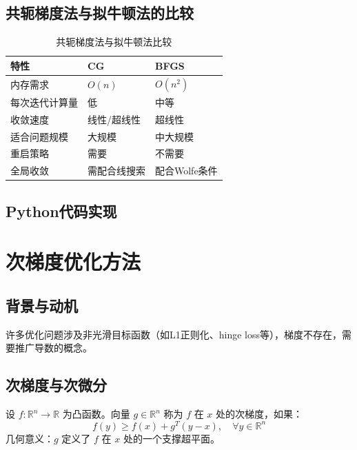 \subsection{共轭梯度法与拟牛顿法的比较}

\begin{table}[H]
\centering
\caption{共轭梯度法与拟牛顿法比较}
\begin{tabular}{@{}lll@{}}
\toprule
\textbf{特性} & \textbf{CG} & \textbf{BFGS} \\
\midrule
内存需求 & $O(n)$ & $O(n^2)$ \\
每次迭代计算量 & 低 & 中等 \\
收敛速度 & 线性/超线性 & 超线性 \\
适合问题规模 & 大规模 & 中大规模 \\
重启策略 & 需要 & 不需要 \\
全局收敛 & 需配合线搜索 & 配合Wolfe条件 \\
\bottomrule
\end{tabular}
\end{table}

\subsection{Python代码实现}\label{sec:conjugate-code}

\section{次梯度优化方法}\label{sec:subgradient}

\subsection{背景与动机}

许多优化问题涉及非光滑目标函数（如L1正则化、hinge loss等），梯度不存在，需要推广导数的概念。

\subsection{次梯度与次微分}\label{sec:subgradient-def}

\begin{definition}[次梯度]
设 $f: \mathbb{R}^n \to \mathbb{R}$ 为凸函数。向量 $g \in \mathbb{R}^n$ 称为 $f$ 在 $x$ 处的次梯度，如果：
\[
f(y) \geq f(x) + g^T(y - x), \quad \forall y \in \mathbb{R}^n
\]
几何意义：$g$ 定义了 $f$ 在 $x$ 处的一个支撑超平面。
\end{definition}


